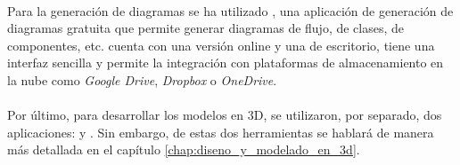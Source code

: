 \documentclass{subfiles}
\begin{document}
        \paragraph{}
        Para la generación de diagramas se ha utilizado \drawio \cite{web:drawio}, una aplicación de generación de diagramas gratuita que permite generar diagramas de flujo, de clases, de componentes, etc. \drawio cuenta con una versión online y una de escritorio, tiene una interfaz sencilla y permite la integración con plataformas de almacenamiento en la nube como \textit{Google Drive}, \textit{Dropbox} o \textit{OneDrive}.

        \paragraph{}
        Por último, para desarrollar los modelos en 3D, se utilizaron, por separado, dos aplicaciones: \makehuman \cite{web:makehuman} y \blender \cite{web:blender}. Sin embargo, de estas dos herramientas se hablará de manera más detallada en el capítulo \ref{chap:diseno_y_modelado_en_3d}.
        
\end{document}
